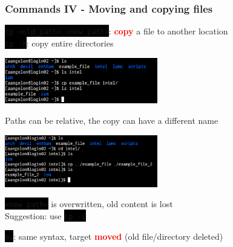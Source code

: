 \documentclass[unknownkeysallowed, 10pt, a4 paper, handout]{beamer}
\newcommand{\focus}[1]{\textbf{\textcolor{red}{#1}}}
\newcommand{\code}[1]{\colorbox{black}{\color{green}\texttt{#1}}}
\begin{document}
\begin{frame}
  \begin{center}
    \frametitle{Commands IV - Moving and copying files}

    \code{cp <old\_path> <new\_path>}: \focus{copy} a file to another location\\
    \code{cp -r}: copy entire directories
    \vspace{-3mm}

    \begin{center}
      \includegraphics[width=0.50\textwidth]{pics/cp_1.png}
    \end{center}

    Paths can be relative, the copy can have a different name\\
    \vspace{-1mm}

    \begin{center}
      \includegraphics[width=0.50\textwidth]{pics/cp_2.png}
    \end{center}

    \code{<new\_path>} is overwritten, old content is lost\\
    Suggestion: use \code{cp -i}

    \code{mv}: same syntax, target \focus{moved} (old file/directory deleted)
  \end{center}
\end{frame}
\end{document}
